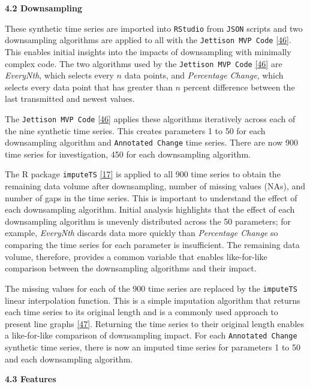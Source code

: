 \documentclass{article}
\begin{document}
\textbf{4.2 Downsampling}

These synthetic time series are imported into \texttt{RStudio} from
\texttt{JSON} scripts and two downsampling algorithms are applied to all
with the \texttt{Jettison\ MVP\ Code}
\protect\hyperlink{ref-Jettison}{{[}46{]}}. This enables initial
insights into the impacts of downsampling with minimally complex code.
The two algorithms used by the \texttt{Jettison\ MVP\ Code}
\protect\hyperlink{ref-Jettison}{{[}46{]}} are \emph{EveryNth}, which
selects every \(n\) data points, and \emph{Percentage Change}, which
selects every data point that has greater than \(n\) percent difference
between the last transmitted and newest values.

The \texttt{Jettison\ MVP\ Code}
\protect\hyperlink{ref-Jettison}{{[}46{]}} applies these algorithms
iteratively across each of the nine synthetic time series. This creates
parameters 1 to 50 for each downsampling algorithm and
\texttt{Annotated\ Change} time series. There are now 900 time series
for investigation, 450 for each downsampling algorithm.

The R package \texttt{imputeTS}
\protect\hyperlink{ref-imputeTS_R}{{[}17{]}} is applied to all 900 time
series to obtain the remaining data volume after downsampling, number of
missing values (NAs), and number of gaps in the time series. This is
important to understand the effect of each downsampling algorithm.
Initial analysis highlights that the effect of each downsampling
algorithm is unevenly distributed across the 50 parameters; for example,
\emph{EveryNth} discards data more quickly than \emph{Percentage Change}
so comparing the time series for each parameter is insufficient. The
remaining data volume, therefore, provides a common variable that
enables like-for-like comparison between the downsampling algorithms and
their impact.

The missing values for each of the 900 time series are replaced by the
\texttt{imputeTS} linear interpolation function. This is a simple
imputation algorithm that returns each time series to its original
length and is a commonly used approach to present line graphs
\protect\hyperlink{ref-compressiontech}{{[}47{]}}. Returning the time
series to their original length enables a like-for-like comparison of
downsampling impact. For each \texttt{Annotated\ Change} synthetic time
series, there is now an imputed time series for parameters 1 to 50 and
each downsampling algorithm.

\textbf{4.3 Features}
\end{document}
